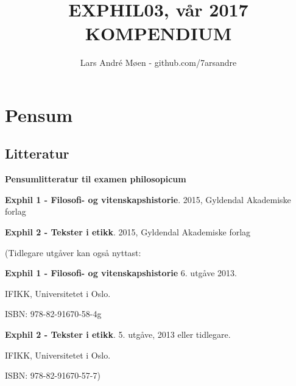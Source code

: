 \documentclass[a4paper]{IEEEtran}
\title{\bigskip EXPHIL03, vår 2017 \\[1cm] KOMPENDIUM \\[5cm]}
\author{Lars André Møen - github.com/7arsandre }
\begin{document}
\maketitle
\onecolumn
\tableofcontents
\clearpage
\twocolumn
\onecolumn

\section{Pensum}
\subsection{Litteratur}
    \begin{center}
        \textbf{Pensumlitteratur til examen philosopicum}\bigskip    
    \end{center}
    
    
    \textbf{Exphil 1 - Filosofi- og vitenskapshistorie}. 2015, Gyldendal Akademiske forlag\bigskip
 
    
    \textbf{Exphil 2 - Tekster i etikk}. 2015, Gyldendal Akademiske forlag\bigskip

    
    (Tidlegare utgåver kan også nyttast: \bigskip
    
    \textbf{Exphil 1 - Filosofi- og vitenskapshistorie} 6. utgåve 2013.
    
     IFIKK, Universitetet i Oslo.
     
     ISBN: 978-82-91670-58-4g\bigskip

    
    \textbf{Exphil 2 - Tekster i etikk}. 5. utgåve, 2013 eller tidlegare.
    
     IFIKK, Universitetet i Oslo.
     
     ISBN: 978-82-91670-57-7)
    
\end{document}
